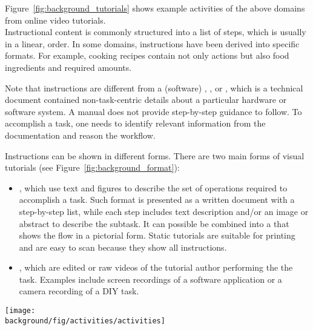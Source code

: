 Figure~\ref{fig:background_tutorials} shows example activities of the above domains from online video tutorials.
\\

%
Instructional content is commonly structured into a list of steps, which is usually in a linear,  order.
%
In some domains, instructions have been derived into specific formats. For example, cooking recipes contain not only actions but also food ingredients and required amounts.

Note that instructions are different from a (software) , , or , which is a technical document contained non-task-centric details about a particular hardware or software system. A manual does not provide step-by-step guidance to follow. To accomplish a task, one needs to identify relevant information from the documentation and reason the workflow.

Instructions can be shown in different forms. There are two main forms of visual tutorials (see Figure~\ref{fig:background_format}):
\begin{itemize}
  \itemsep -2pt
  \item {}, which use text and figures to describe the set of operations required to accomplish a task. Such format is presented as a written document with a step-by-step list, while each step includes text description and/or an image or abstract  to describe the subtask. It can possible be combined into a  that shows the flow in a pictorial form. Static tutorials are suitable for printing and are easy to scan because they show all instructions.
  \item {}, which are edited or raw videos of the tutorial author performing the the task. Examples include screen recordings of a software application or a camera recording of a DIY task.
\end{itemize}

\begin{figure*}[t]
  \centering
  \begin{minipage}{\textwidth}
  \texttt{[image: \\background/fig/activities/activities]}
  \caption[activities]{Example activities in tutorial domains:
  a) image manipulations using a software application
  \footnote{Photoshop Playbook: Selective Focus \url{https://youtu.be/Wh3ahxqDnyw}},
  b) a DIY gift-wrapping project
  \footnote{One Kings Lane: How to Wrap the Perfect Gift \url{https://youtu.be/Me3ykrZobJE}},
  c) cooking as an everyday activity
  \footnote{Slow-cooked black treacle ham \url{http://www.bbc.co.uk/food/recipes/slow-cooked_black_21152}}, and
  d) dancing in sports
  \footnote{Ballet 101: How to Do the Fouette in Ballet Dancing \url{https://youtu.be/DzqQNlaahjs}}.
  }
  \end{minipage}
  \label{fig:background_tutorials}
\end{figure*}


